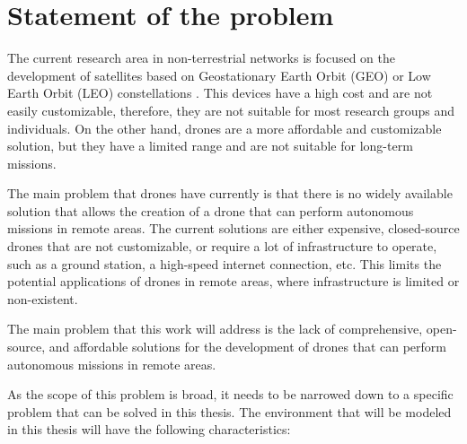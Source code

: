 \chapter{Statement of the problem}

The current research area in non-terrestrial networks is focused on the development of satellites based on Geostationary Earth Orbit (GEO) or Low Earth Orbit (LEO) constellations \autocite{non_terrestial_networks_trends}. This devices have a high cost and are not easily customizable, therefore, they are not suitable for most research groups and individuals. On the other hand, drones are a more affordable and customizable solution, but they have a limited range and are not suitable for long-term missions.

The main problem that drones have currently is that there is no widely available solution that allows the creation of a drone that can perform autonomous missions in remote areas. The current solutions are either expensive, closed-source drones that are not customizable, or require a lot of infrastructure to operate, such as a ground station, a high-speed internet connection, etc. This limits the potential applications of drones in remote areas, where infrastructure is limited or non-existent.

The main problem that this work will address is the lack of comprehensive, open-source, and affordable solutions for the development of drones that can perform autonomous missions in remote areas.

As the scope of this problem is broad, it needs to be narrowed down to a specific problem that can be solved in this thesis. The environment that will be modeled in this thesis will have the following characteristics:

